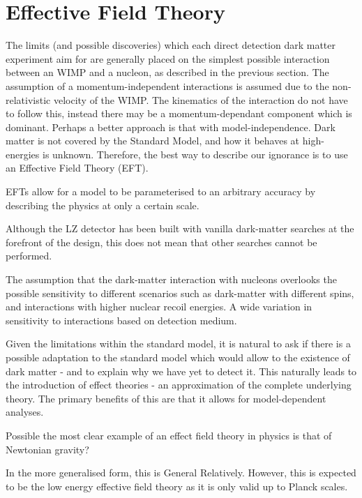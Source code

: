 \section{Effective Field Theory} \label{eft_theory}

\par
The limits (and possible discoveries) which each direct detection dark matter experiment aim for are generally placed on the simplest possible interaction between an WIMP and a nucleon, as described in the previous section.
The assumption of a momentum-independent interactions is assumed due to the non-relativistic velocity of the WIMP.
The kinematics of the interaction do not have to follow this, instead there may be a momentum-dependant component which is dominant.
Perhaps a better approach is that with model-independence.
Dark matter is not covered by the Standard Model, and how it behaves at high-energies is unknown.
Therefore, the best way to describe our ignorance is to use an Effective Field Theory (EFT).

\par
EFTs allow for a model to be parameterised to an arbitrary accuracy by describing the physics at only a certain scale.

Although the LZ detector has been built with vanilla dark-matter searches at the forefront of the design, this does not mean that other searches cannot be performed. 

\par
The assumption that the dark-matter interaction with nucleons overlooks the possible sensitivity to different scenarios such as dark-matter with different spins, and interactions with higher nuclear recoil energies.
A wide variation in sensitivity to interactions based on detection medium.

\par
Given the limitations within the standard model, it is natural to ask if there is a possible adaptation to the standard model which would allow to the existence of dark matter - and to explain why we have yet to detect it.
This naturally leads to the introduction of effect theories - an approximation of the complete underlying theory.
The primary benefits of this are that it allows for model-dependent analyses.

\par
Possible the most clear example of an effect field theory in physics is that of Newtonian gravity?

\par
In the more generalised form, this is General Relatively.
However, this is expected to be the low energy effective field theory as it is only valid up to Planck scales.


